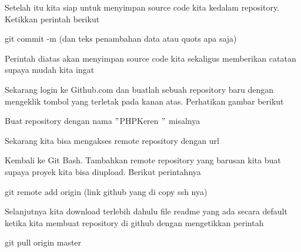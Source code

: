 \noindent 
{\fontsize{14pt}{14pt}\selectfont Setelah itu kita siap untuk menyimpan source code kita kedalam repository. Ketikkan perintah berikut \\} \par
\noindent 
{\fontsize{14pt}{14pt}\selectfont git commit -m (dan teks penambahan data atau quots apa saja) \\} \par
\vspace{14pt}
\noindent 
{\fontsize{14pt}{14pt}\selectfont Perintah diatas akan menyimpan source code kita sekaligus memberikan catatan supaya mudah kita ingat \\} \par
\vspace{14pt}
\noindent 
{\fontsize{14pt}{14pt}\selectfont Sekarang login ke Github.com dan buatlah sebuah repository baru dengan mengeklik tombol yang terletak pada kanan atas. Perhatikan gambar berikut \\} \par
\vspace{14pt}
\noindent 
{\fontsize{14pt}{14pt}\selectfont Buat repository dengan nama  $ " $PHPKeren $ " $ misalnya \\} \par
\vspace{14pt}
\noindent 
{\fontsize{14pt}{14pt}\selectfont Sekarang kita bisa mengakses remote repository dengan url \\} \par
\vspace{14pt}
\noindent 
{\fontsize{14pt}{14pt}\selectfont Kembali ke Git Bash. Tambahkan remote repository yang barusan kita buat supaya proyek kita bisa diupload. Berikut perintahnya \\} \par
\vspace{14pt}
\noindent 
{\fontsize{14pt}{14pt}\selectfont git remote add origin (link github yang di copy ssh nya) \\} \par
\vspace{14pt}
\noindent 
{\fontsize{14pt}{14pt}\selectfont Selanjutnya kita download terlebih dahulu file readme yang ada secara default ketika kita membuat repository di github dengan mengetikkan perintah \\} \par
\vspace{14pt}
\noindent 
{\fontsize{14pt}{14pt}\selectfont git pull origin master \\} \par
